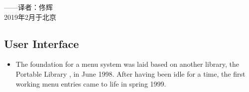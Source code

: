 \begin{flushright}
——译者：佟辉\\
2019年2月于北京
\end{flushright}


\fi
\iffalse
\subsection{User Interface}
\begin{itemize}
\item The foundation for a menu system was laid based on another library,
 the Portable Library \PLIB{}, in June 1998. After having been idle for a time, the first working menu entries came to life in spring 1999.


\end{itemize}
